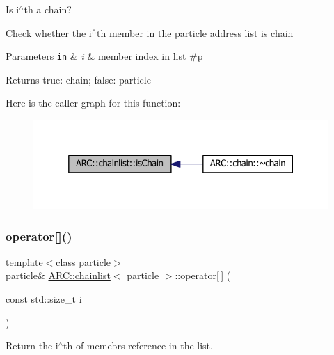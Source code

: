 Is i$^\wedge$th a chain? 

Check whether the i$^\wedge$th member in the particle address list is chain 
\begin{DoxyParams}[1]{Parameters}
\mbox{\tt in}  & {\em i} & member index in list \#p \\
\hline
\end{DoxyParams}
\begin{DoxyReturn}{Returns}
true\+: chain; false\+: particle 
\end{DoxyReturn}
Here is the caller graph for this function\+:
\nopagebreak
\begin{figure}[H]
\begin{center}
\leavevmode
\includegraphics[width=332pt]{classARC_1_1chainlist_a192f6db3659e5329d137de18c8c4b029_icgraph}
\end{center}
\end{figure}
\hypertarget{classARC_1_1chainlist_a256df9d527eb305e14207f1ae476685c}{}\label{classARC_1_1chainlist_a256df9d527eb305e14207f1ae476685c} 
\subsubsection{\texorpdfstring{operator[]()}{operator[]()}}
{\footnotesize\ttfamily template$<$class particle$>$ \\
particle\& \hyperlink{classARC_1_1chainlist}{A\+R\+C\+::chainlist}$<$ particle $>$\+::operator\mbox{[}$\,$\mbox{]} (\begin{DoxyParamCaption}\item[{const std\+::size\+\_\+t}]{i }\end{DoxyParamCaption})\hspace{0.3cm}{\ttfamily [inline]}}



Return the i$^\wedge$th of memebr\textquotesingle{}s reference in the list. 

